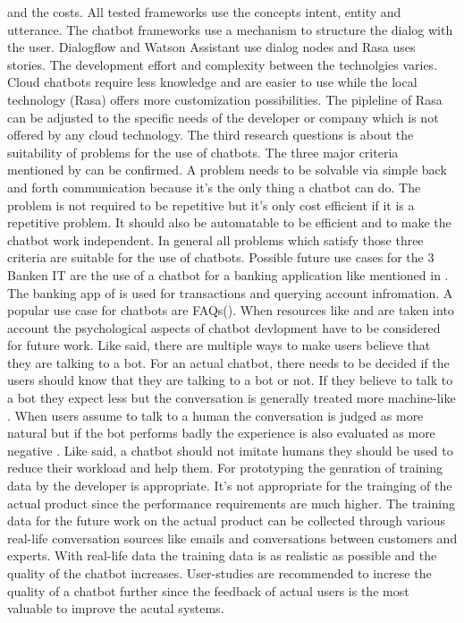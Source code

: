 and the costs.
All tested frameworks use the concepts intent, entity and utterance.
The chatbot frameworks use a mechanism to structure the dialog with the user.
Dialogflow and Watson Assistant use dialog nodes and Rasa uses stories.
The development effort and complexity between the technolgies varies.
Cloud chatbots require less knowledge and are easier to use while the local technology (Rasa) 
offers more customization possibilities.
The pipleline of Rasa can be adjusted to the specific needs of the developer or company which 
is not offered by any cloud technology.
The third research questions is about the suitability of problems for the use of chatbots.
The three major criteria mentioned by \citet{singhbuilding} can be confirmed.
A problem needs to be solvable via simple back and forth communication because it's the 
only thing a chatbot can do.
The problem is not required to be repetitive but it's only cost efficient if it is 
a repetitive problem.
It should also be automatable to be efficient and to make the chatbot work independent.
In general all problems which satisfy those three criteria are suitable for the use of chatbots.
Possible future use cases for the 3 Banken IT are the use of a chatbot for a banking
application like mentioned in \citet{singhbuilding}.
The banking app of \cite{singhbuilding} is used for transactions and querying account infromation.
A popular use case for chatbots are FAQs(\citet{evaluateChatbotsShawar2007, buiildChatbotsPython, huang2007extracting, GO2019304}).
When resources like \citet{} and \citet{} are taken into account the psychological aspects of 
chatbot devlopment have to be considered for future work.
Like \citet{GO2019304} said, there are multiple ways to make users believe that they are talking to a bot.
For an actual chatbot, there needs to be decided if the users should know that they are talking to a bot or not.
If they believe to talk to a bot they expect less but the conversation is generally treated more machine-like \cite{GO2019304}.
When users assume to talk to a human the conversation is judged as more natural but if the bot performs badly the experience is also evaluated as more negative \cite{GO2019304}.
Like \citet{shawar2007chatbots} said, a chatbot should not imitate humans they should be used to reduce their workload and help them.
For prototyping the genration of training data by the developer is appropriate.
It's not appropriate for the trainging of the actual product since the performance
requirements are much higher.
The training data for the future work on the actual product can be collected through various
real-life conversation sources like emails and conversations between customers and experts.
With real-life data the training data is as realistic as possible and the quality of the chatbot 
increases.
User-studies are recommended to increse the quality of a chatbot further since the feedback 
of actual users is the most valuable to improve the acutal systems.
